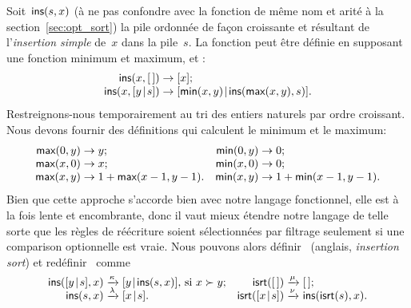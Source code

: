 Soit~\(\textsf{ins}(s,x)\) (à ne pas confondre
avec la fonction de même nom et arité à la section~\ref{sec:opt_sort})
la pile ordonnée de façon croissante et résultant de l'\emph{insertion
  simple} de~\(x\) dans la pile~\(s\). La fonction  peut
être définie en supposant une fonction minimum et maximum,
 et
:
\begin{equation*}
\begin{array}{@{}r@{\;}l@{\;}l@{}}
\fun{ins}(x,\el) & \rightarrow & [x];\\
\fun{ins}(x,\cons{y}{s}) & \rightarrow &
\cons{\fun{min}(x,y)}{\fun{ins}(\fun{max}(x,y),s)}.
\end{array}
\end{equation*}
Restreignons-nous temporairement au tri des entiers naturels par ordre
croissant. Nous devons fournir des définitions qui calculent le
minimum et le maximum:
\begin{equation*}
\begin{array}{@{}r@{\;}l@{\;}lr@{\;}l@{\;}l@{}}
  \fun{max}(0,y) & \rightarrow & y; & \fun{min}(0,y) & \rightarrow & 0;\\
  \fun{max}(x,0) & \rightarrow & x; & \fun{min}(x,0) & \rightarrow & 0;\\
  \fun{max}(x,y) & \rightarrow & 1 + \fun{max}(x-1,y-1).
& \fun{min}(x,y) & \rightarrow & 1 + \fun{min}(x-1,y-1).
\end{array}
\end{equation*}
Bien que cette approche s'accorde bien avec notre langage fonctionnel,
elle est à la fois lente et encombrante, donc il vaut mieux étendre
notre langage de telle sorte que les règles de réécriture soient
sélectionnées par filtrage seulement si une comparison optionnelle est
vraie. Nous pouvons alors
définir~ (anglais,
\emph{insertion sort}) et
redéfinir~ comme
\begin{equation*}
\begin{array}{@{}r@{\;}l@{\;}lr@{\;}l@{\;}l@{}}
  \fun{ins}(\cons{y}{s},x)
& \xrightarrow{\smash{\kappa}}
& \cons{y}{\fun{ins}(s,x)}, \,\text{si \(x \succ y\)};
& \fun{isrt}(\el)
& \xrightarrow{\smash{\mu}}
& \el;\\
  \fun{ins}(s,x)
& \xrightarrow{\smash{\lambda}}
& \cons{x}{s}.
& \fun{isrt}(\cons{x}{s})
& \xrightarrow{\smash{\nu}}
& \fun{ins}(\fun{isrt}(s),x).
\end{array}
\end{equation*}
